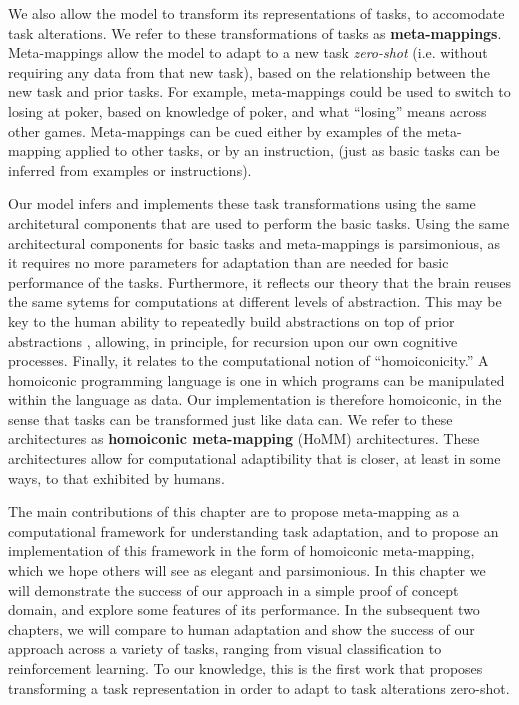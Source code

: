 We also allow the model to transform its representations of tasks, to accomodate task alterations. We refer to these transformations of tasks as \textbf{meta-mappings}. Meta-mappings allow the model to adapt to a new task \emph{zero-shot} (i.e. without requiring any data from that new task), based on the relationship between the new task and prior tasks. For example, meta-mappings could be used to switch to losing at poker, based on knowledge of poker, and what ``losing'' means across other games. Meta-mappings can be cued either by examples of the meta-mapping applied to other tasks, or by an instruction, (just as basic tasks can be inferred from examples or instructions). 

Our model infers and implements these task transformations using the same architetural components that are used to perform the basic tasks. Using the same architectural components for basic tasks and meta-mappings is parsimonious, as it requires no more parameters for adaptation than are needed for basic performance of the tasks. Furthermore, it reflects our theory that the brain reuses the same sytems for computations at different levels of abstraction. This may be key to the human ability to repeatedly build abstractions on top of prior abstractions \citep{Wilensky1991, Hazzan1999, Lampinen2017b}, allowing, in principle, for recursion upon our own cognitive processes. Finally, it relates to the computational notion of ``homoiconicity.'' A homoiconic programming language is one in which programs can be manipulated within the language as data. Our implementation is therefore homoiconic, in the sense that tasks can be transformed just like data can. We refer to these architectures as \textbf{homoiconic meta-mapping} (HoMM) architectures. These architectures allow for computational adaptibility that is closer, at least in some ways, to that exhibited by humans.  

The main contributions of this chapter are to propose meta-mapping as a computational framework for understanding task adaptation, and to propose an implementation of this framework in the form of homoiconic meta-mapping, which we hope others will see as elegant and parsimonious. In this chapter we will demonstrate the success of our approach in a simple proof of concept domain, and explore some features of its performance. In the subsequent two chapters, we will compare to human adaptation and show the success of our approach across a variety of tasks, ranging from visual classification to reinforcement learning. To our knowledge, this is the first work that proposes transforming a task representation in order to adapt to task alterations zero-shot. 


